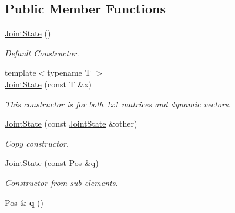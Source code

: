 \subsection*{Public Member Functions}
\begin{DoxyCompactItemize}
\item 
\hyperlink{classow__core_1_1JointState_a76834040169f792ff7a3c54d13fc34b7}{Joint\+State} ()\hypertarget{classow__core_1_1JointState_a76834040169f792ff7a3c54d13fc34b7}{}\label{classow__core_1_1JointState_a76834040169f792ff7a3c54d13fc34b7}

\begin{DoxyCompactList}\small\item\em Default Constructor. \end{DoxyCompactList}\item 
{\footnotesize template$<$typename T $>$ }\\\hyperlink{classow__core_1_1JointState_a545ca730711a387f987b98396304dbfa}{Joint\+State} (const T \&x)\hypertarget{classow__core_1_1JointState_a545ca730711a387f987b98396304dbfa}{}\label{classow__core_1_1JointState_a545ca730711a387f987b98396304dbfa}

\begin{DoxyCompactList}\small\item\em This constructor is for both 1x1 matrices and dynamic vectors. \end{DoxyCompactList}\item 
\hyperlink{classow__core_1_1JointState_a273356de13903acfccd84c7789056381}{Joint\+State} (const \hyperlink{classow__core_1_1JointState}{Joint\+State} \&other)\hypertarget{classow__core_1_1JointState_a273356de13903acfccd84c7789056381}{}\label{classow__core_1_1JointState_a273356de13903acfccd84c7789056381}

\begin{DoxyCompactList}\small\item\em Copy constructor. \end{DoxyCompactList}\item 
\hyperlink{classow__core_1_1JointState_a2c519fda8d5e1398e8e7e5308befbe1d}{Joint\+State} (const \hyperlink{classow__core_1_1JointPosition}{Pos} \&q)
\begin{DoxyCompactList}\small\item\em Constructor from sub elements. \end{DoxyCompactList}\item 
\hyperlink{classow__core_1_1JointPosition}{Pos} \& {\bfseries q} ()\hypertarget{classow__core_1_1JointState_a5ce959881c11c5e4eadd8a4c5e8861eb}{}\label{classow__core_1_1JointState_a5ce959881c11c5e4eadd8a4c5e8861eb}


\end{DoxyCompactItemize}

